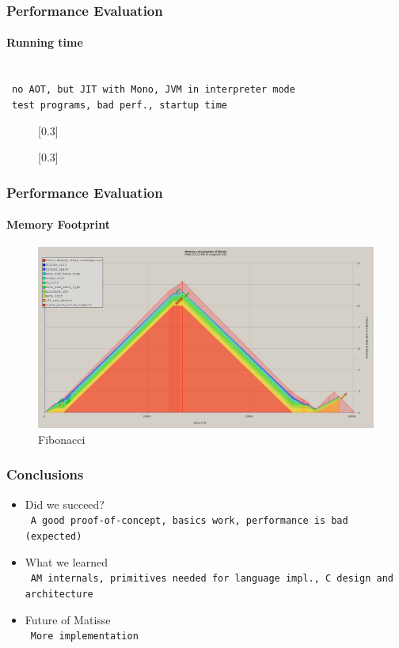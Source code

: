 \documentclass{beamer}
\newcommand{\n}[1]{\leavevmode\\~\texttt{\color{red}\tiny #1}}
\begin{document}
\begin{frame}
  \frametitle{Performance Evaluation}
  \framesubtitle{Running time}

  \n{no AOT, but JIT with Mono, JVM in interpreter mode}
  \n{test programs, bad perf., startup time}

  \begin{figure}
    \centering
    \begin{minipage}{.5\textwidth}
      \centering
          \scalebox{0.36}[0.3]{}
    \end{minipage}%
    \begin{minipage}{.5\textwidth}
      \centering
          \scalebox{0.36}[0.3]{}
    \end{minipage}
  \end{figure}
\end{frame}

\begin{frame}
  \frametitle{Performance Evaluation}
  \framesubtitle{Memory Footprint}

  \begin{figure}[H]
    \centering
    \includegraphics[scale=0.23]{../figures/fig-mem}
    \caption{Fibonacci}
  \end{figure}
\end{frame}

\begin{frame}
  \frametitle{Conclusions}

  \begin{itemize}[<+->]
  \item Did we succeed?
    \n{A good proof-of-concept, basics work, performance is bad (expected)}
  \item What we learned
    \n{AM internals, primitives needed for language impl., C design and architecture}
  \item Future of Matisse
    \n{More implementation}
  \end{itemize}
\end{frame}
\end{document}
